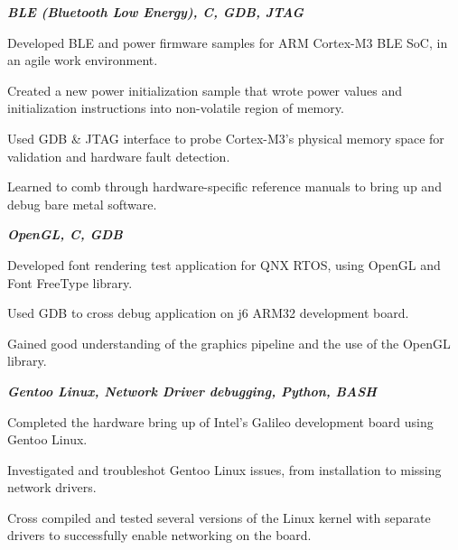 \documentclass[letterpaper, 10pt]{deedy-resume} %
\begin{document}
\begin{minipage}[t]{0.65\textwidth}
\textit{\bf{BLE (Bluetooth Low Energy), C, GDB, JTAG}}
\vspace{\topsep} %
\begin{tightitemize}
\item Developed BLE and power firmware samples for ARM Cortex-M3 BLE SoC, in an agile work environment.
\item Created a new power initialization sample that wrote power values and initialization instructions into non-volatile region of memory.
\item Used GDB \& JTAG interface to probe Cortex-M3's physical memory space for validation and hardware fault detection.
\item Learned to comb through hardware-specific reference manuals to bring up and debug bare metal software. 
\end{tightitemize}

\sectionspace
{}
\textit{\bf{OpenGL, C, GDB}}
\vspace{\topsep} %
\begin{tightitemize}
\item Developed font rendering test application for QNX RTOS, using OpenGL and Font FreeType library. 
\item Used GDB to cross debug application on j6 ARM32 development board.
\item Gained good understanding of the graphics pipeline and the use of the OpenGL library. 
\end{tightitemize}
\sectionspace

\textit{\bf{Gentoo Linux, Network Driver debugging, Python, BASH}}
\vspace{\topsep} %
\begin{tightitemize}
\item Completed the hardware bring up of Intel's Galileo development board using Gentoo Linux. 
\item Investigated and troubleshot Gentoo Linux issues, from installation to missing network drivers.
\item Cross compiled and tested several versions of the Linux kernel with separate drivers to successfully enable networking on the board. 
\end{tightitemize}
\sectionspace

\end{minipage} %
\end{document}

